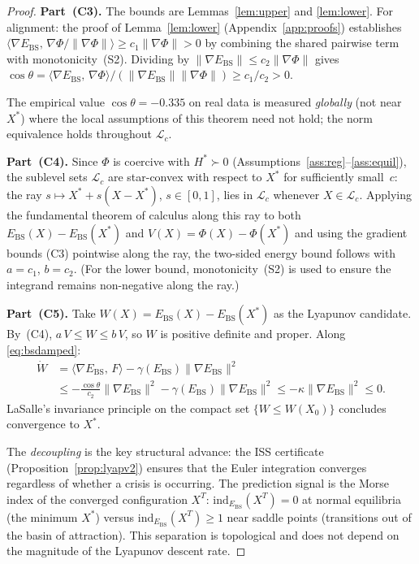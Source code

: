 \documentclass[final]{siamltex}
\newcommand{\norm}[1]{\lVert #1 \rVert}
\newcommand{\inner}[2]{\langle #1,\, #2 \rangle}
\providecommand{\grad}{\nabla}
\newcommand{\Ebs}{E_{\mathrm{BS}}}
\newcommand{\Xst}{X^*}
\newcommand{\costheta}{\cos\theta}
\begin{document}
\begin{proof}
\textbf{Part~(C3).} The bounds are Lemmas~\ref{lem:upper} and
\ref{lem:lower}. For alignment: the proof of Lemma~\ref{lem:lower}
(Appendix~\ref{app:proofs}) establishes
$\inner{\grad\Ebs}{\grad\Phi / \norm{\grad\Phi}}
\ge c_1\norm{\grad\Phi} > 0$
by combining the shared pairwise term with monotonicity~(S2).
Dividing by $\norm{\grad\Ebs}\le c_2\norm{\grad\Phi}$ gives
$\costheta = \inner{\grad\Ebs}{\grad\Phi}
/ (\norm{\grad\Ebs}\norm{\grad\Phi}) \ge c_1/c_2 > 0$.

The empirical value $\costheta = -0.335$ on real data is measured
\emph{globally} (not near $\Xst$) where the local assumptions of
this theorem need not hold; the norm equivalence holds throughout
$\mathcal{L}_c$.

\textbf{Part~(C4).} Since $\Phi$ is coercive with
$H^*\succ 0$ (Assumptions~\ref{ass:reg}--\ref{ass:equil}),
the sublevel sets $\mathcal{L}_c$ are star-convex with respect
to $\Xst$ for sufficiently small~$c$: the ray
$s\mapsto\Xst + s(X{-}\Xst)$, $s\in[0,1]$, lies in
$\mathcal{L}_c$ whenever $X\in\mathcal{L}_c$. Applying the
fundamental theorem of calculus along this ray to both
$\Ebs(X) - \Ebs(\Xst)$ and $V(X) = \Phi(X) - \Phi(\Xst)$
and using the gradient bounds (C3) pointwise along the ray,
the two-sided energy bound follows with $a = c_1$, $b = c_2$.
(For the lower bound, monotonicity~(S2) is used to ensure the
integrand remains non-negative along the ray.)

\textbf{Part~(C5).} Take $W(X)=\Ebs(X)-\Ebs(\Xst)$ as the
Lyapunov candidate. By~(C4), $a\,V\le W\le b\,V$, so $W$ is
positive definite and proper. Along \eqref{eq:bsdamped}:
\begin{align*}
  \dot{W} &= \inner{\grad\Ebs}{F} - \gamma(\Ebs)\norm{\grad\Ebs}^2 \\
  &\le -\frac{\costheta}{c_2}\norm{\grad\Ebs}^2
  - \gamma(\Ebs)\norm{\grad\Ebs}^2
  \le -\kappa\norm{\grad\Ebs}^2 \le 0.
\end{align*}
LaSalle's invariance principle \cite{lasalle1960} on the compact
set $\{W\le W(X_0)\}$ concludes convergence to $\Xst$.

The \emph{decoupling} is the key structural advance: the ISS
certificate (Proposition~\ref{prop:lyapv2}) ensures that the
Euler integration converges regardless of whether a crisis is
occurring.  The prediction signal is the Morse index of the
converged configuration $X^T$: $\mathrm{ind}_{\Ebs}(X^T) = 0$
at normal equilibria (the minimum $\Xst$) versus
$\mathrm{ind}_{\Ebs}(X^T) \ge 1$ near saddle points
(transitions out of the basin of attraction).  This separation
is topological and does not depend on the magnitude of the
Lyapunov descent rate.
\end{proof}
\end{document}
